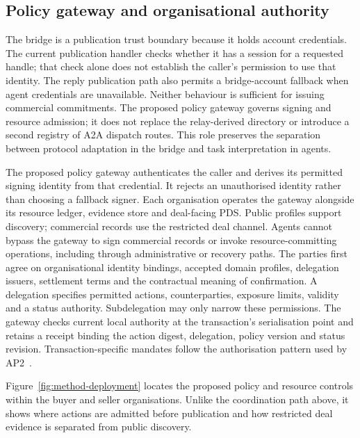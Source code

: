 \subsection{Policy gateway and organisational authority}

The bridge is a publication trust boundary because it holds account credentials. The current publication handler checks whether it has a session for a requested handle; that check alone does not establish the caller's permission to use that identity. The reply publication path also permits a bridge-account fallback when agent credentials are unavailable. Neither behaviour is sufficient for issuing commercial commitments. The proposed policy gateway governs signing and resource admission; it does not replace the relay-derived directory or introduce a second registry of A2A dispatch routes. This role preserves the separation between protocol adaptation in the bridge and task interpretation in agents.

The proposed policy gateway authenticates the caller and derives its permitted signing identity from that credential. It rejects an unauthorised identity rather than choosing a fallback signer. Each organisation operates the gateway alongside its resource ledger, evidence store and deal-facing PDS. Public profiles support discovery; commercial records use the restricted deal channel. Agents cannot bypass the gateway to sign commercial records or invoke resource-committing operations, including through administrative or recovery paths. The parties first agree on organisational identity bindings, accepted domain profiles, delegation issuers, settlement terms and the contractual meaning of confirmation. A delegation specifies permitted actions, counterparties, exposure limits, validity and a status authority. Subdelegation may only narrow these permissions. The gateway checks current local authority at the transaction's serialisation point and retains a receipt binding the action digest, delegation, policy version and status revision. Transaction-specific mandates follow the authorisation pattern used by AP2~\citep{ap2auth}.

Figure~\ref{fig:method-deployment} locates the proposed policy and resource controls within the buyer and seller organisations. Unlike the coordination path above, it shows where actions are admitted before publication and how restricted deal evidence is separated from public discovery.

